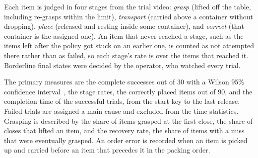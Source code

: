 Each item is judged in four stages from the trial video: \emph{grasp} (lifted
off the table, including re-grasps within the limit), \emph{transport} (carried
above a container without dropping), \emph{place} (released and resting inside
some container), and \emph{correct} (that container is the assigned one). An
item that never reached a stage, such as the items left after the policy
got stuck on an earlier one, is counted as not attempted there rather than as
failed, so each stage's rate is over the items that reached it. Borderline final states were decided by the
operator, who watched every trial.

The primary measures are the complete successes out of 30 with a Wilson 95\%
confidence interval~\cite{wilson1927probable}, the stage rates, the correctly
placed items out of 90, and the completion time of the successful trials, from
the start key to the last release. Failed trials are assigned a main cause and
excluded from the time statistics. Grasping is described by the share of items grasped at the first
close, the share of closes that lifted an item, and the recovery rate, the
share of items with a miss that were eventually grasped.
An order error is recorded when an item is picked up and carried before an item
that precedes it in the packing order.
